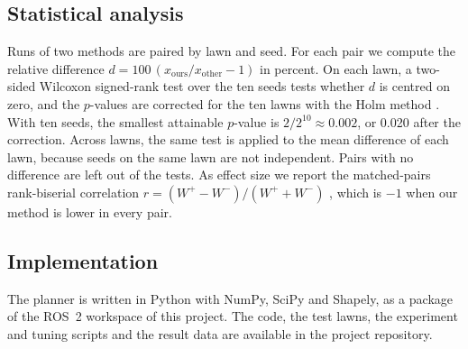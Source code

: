 \subsection{Statistical analysis}
\label{sec:setup-statistics}

Runs of two methods are paired by lawn and seed.
For each pair we compute the relative difference $d = 100\,(x_{\mathrm{ours}} / x_{\mathrm{other}} - 1)$ in percent.
On each lawn, a two-sided Wilcoxon signed-rank test \cite{wilcoxonIndividualComparisonsRanking1945} over the ten seeds tests whether $d$ is centred on zero, and the $p$-values are corrected for the ten lawns with the Holm method \cite{holmSimpleSequentiallyRejective1979}.
With ten seeds, the smallest attainable $p$-value is $2/2^{10} \approx 0.002$, or 0.020 after the correction.
Across lawns, the same test is applied to the mean difference of each lawn, because seeds on the same lawn are not independent.
Pairs with no difference are left out of the tests.
As effect size we report the matched-pairs rank-biserial correlation $r = (W^{+} - W^{-})/(W^{+} + W^{-})$ \cite{kerbySimpleDifferenceFormula2014}, which is $-1$ when our method is lower in every pair.

\subsection{Implementation}
\label{sec:setup-implementation}

The planner is written in Python with NumPy, SciPy and Shapely, as a package of the ROS~2 workspace of this project.
The code, the test lawns, the experiment and tuning scripts and the result data are available in the project repository.
